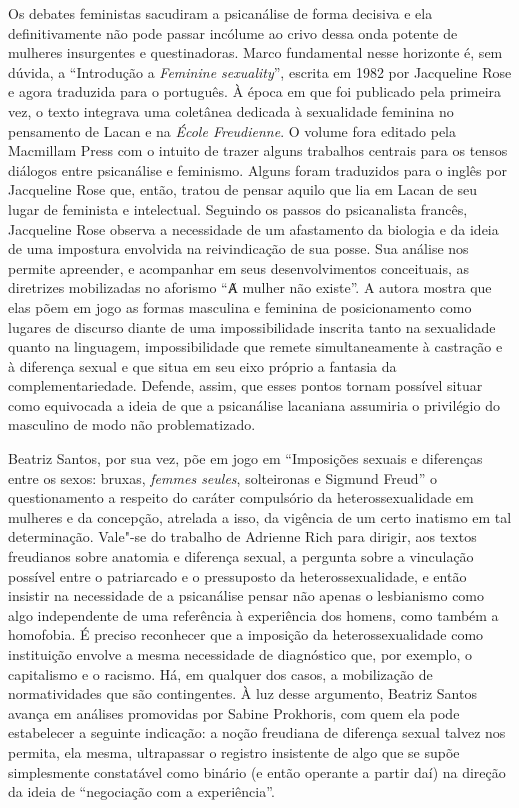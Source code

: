 Os debates feministas sacudiram a psicanálise de forma decisiva e ela
definitivamente não pode passar incólume ao crivo dessa onda potente de
mulheres insurgentes e questinadoras. Marco fundamental nesse horizonte
é, sem dúvida, a ``Introdução  a \emph{Feminine sexuality}'', escrita em 1982
por Jacqueline Rose e agora traduzida para o português. À época em que
foi publicado pela primeira vez, o texto integrava uma coletânea
dedicada à sexualidade feminina no pensamento de Lacan e na \emph{École
Freudienne}. O volume fora editado pela Macmillam Press com o intuito de
trazer alguns trabalhos centrais para os tensos diálogos entre
psicanálise e feminismo. Alguns foram traduzidos para o inglês por
Jacqueline Rose que, então, tratou de pensar aquilo que lia em Lacan
de seu lugar de feminista e intelectual. Seguindo os passos do
psicanalista francês, Jacqueline Rose observa a necessidade de um
afastamento da biologia e da ideia de uma impostura envolvida na
reivindicação de sua posse. Sua análise nos permite apreender, e
acompanhar em seus desenvolvimentos conceituais, as diretrizes
mobilizadas no aforismo ``Ⱥ mulher não existe''. A autora mostra que
elas põem em jogo as formas masculina e feminina de posicionamento como
lugares de discurso diante de uma impossibilidade inscrita tanto na
sexualidade quanto na linguagem, impossibilidade que remete
simultaneamente à castração e à diferença sexual e que situa em seu eixo
próprio a fantasia da complementariedade. Defende, assim, que esses
pontos tornam possível situar como equivocada a ideia de que a
psicanálise lacaniana assumiria o privilégio do masculino de modo não
problematizado.

Beatriz Santos, por sua vez, põe em jogo em ``Imposições sexuais e
diferenças entre os sexos: bruxas, \emph{femmes seules}, solteironas e
Sigmund Freud'' o questionamento a respeito do caráter compulsório da
heterossexualidade em mulheres e da concepção, atrelada a isso, da
vigência de um certo inatismo em tal determinação. Vale"-se do trabalho
de Adrienne Rich para dirigir, aos textos freudianos sobre anatomia e
diferença sexual, a pergunta sobre a vinculação possível entre o
patriarcado e o pressuposto da heterossexualidade, e então insistir na
necessidade de a psicanálise pensar não apenas o lesbianismo como algo
independente de uma referência à experiência dos homens, como também a
homofobia. É preciso reconhecer que a imposição da heterossexualidade
como instituição envolve a mesma necessidade de diagnóstico que, por
exemplo, o capitalismo e o racismo. Há, em qualquer dos casos, a
mobilização de normatividades que são contingentes. À luz desse
argumento, Beatriz Santos avança em análises promovidas por Sabine
Prokhoris, com quem ela pode estabelecer a seguinte indicação: a noção
freudiana de diferença sexual talvez nos permita, ela mesma, ultrapassar
o registro insistente de algo que se supõe simplesmente constatável como
binário (e então operante a partir daí) na direção da ideia de
``negociação com a experiência''.

